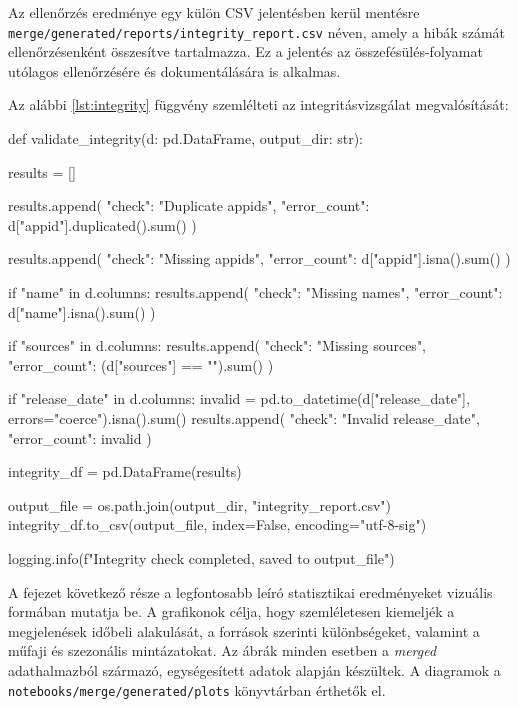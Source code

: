 Az ellenőrzés eredménye egy külön CSV jelentésben kerül mentésre \\ \texttt{merge/generated/reports/integrity\_report.csv} néven, amely a hibák számát ellenőrzésenként összesítve tartalmazza. Ez a jelentés az összefésülés-folyamat utólagos ellenőrzésére és dokumentálására is alkalmas.

Az alábbi \ref{lst:integrity} függvény szemlélteti az integritásvizsgálat megvalósítását:

\begin{python}[caption={Integritásvizsgálat megvalósítása},captionpos=b,label={lst:integrity}]
def validate_integrity(d: pd.DataFrame, output_dir: str):

    results = []

    results.append({
        "check": "Duplicate appids",
        "error_count": d["appid"].duplicated().sum()
    })

    results.append({
        "check": "Missing appids",
        "error_count": d["appid"].isna().sum()
    })

    if "name" in d.columns:
        results.append({
            "check": "Missing names",
            "error_count": d["name"].isna().sum()
        })

    if "sources" in d.columns:
        results.append({
            "check": "Missing sources",
            "error_count": (d["sources"] == "").sum()
        })

    if "release_date" in d.columns:
        invalid = pd.to_datetime(d["release_date"], 
        errors="coerce").isna().sum()
        results.append({
            "check": "Invalid release_date",
            "error_count": invalid
        })

    integrity_df = pd.DataFrame(results)

    output_file = os.path.join(output_dir, "integrity_report.csv")
    integrity_df.to_csv(output_file, index=False, encoding="utf-8-sig")

    logging.info(f"Integrity check completed, saved to {output_file}")
\end{python}



A fejezet következő része a legfontosabb leíró statisztikai eredményeket
vizuális formában mutatja be. A grafikonok célja, hogy szemléletesen kiemeljék
a megjelenések időbeli alakulását, a források szerinti különbségeket, valamint
a műfaji és szezonális mintázatokat. Az ábrák minden esetben a \textit{merged}
adathalmazból származó, egységesített adatok alapján készültek.
A diagramok a \texttt{notebooks/merge/generated/plots} könyvtárban érthetők el.

